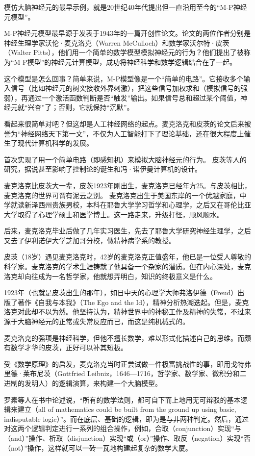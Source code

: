 模仿大脑神经元的最早示例，就是20世纪40年代提出但一直沿用至今的“M-P神经元模型”。

M-P神经元模型最早源于发表于1943年的一篇开创性论文。论文的两位作者分别是神经生理学家沃伦·麦克洛克（Warren McCulloch）和数学家沃尔特·皮茨（Walter Pitts），他们用一个简单的数学模型模拟神经元的行为？他们提出了被称为“M-P模型”的神经元计算模型，成功将神经科学和数学逻辑结合在了一起。

这个模型是怎么回事？简单来说，M-P模型像是一个“简单的电路”。它接收多个输入信号（比如神经元的树突接收外界刺激），把这些信号加权求和（模拟信号的强弱），再通过一个激活函数判断是否“触发”输出。如果信号总和超过某个阈值，神经元就“兴奋”了；否则，它就保持“沉默”。

看起来很简单对吧？但这却是人工神经网络的起点。麦克洛克和皮茨的论文后来被誉为“神经网络天下第一文”，不仅为人工智能打下了理论基础，还在很大程度上催生了现代计算机科学的发展。


首次实现了用一个简单电路（即感知机）来模拟大脑神经元的行为。
皮茨等人的研究，据说甚至影响了控制论的诞生和冯·诺伊曼计算机的设计。

麦克洛克比皮茨大一辈，皮茨1923年刚出生，麦克洛克已经年方25。与皮茨相比，麦克洛克的世界可谓有泥云之别。
麦克洛克出生于美国东岸的一个优越家庭，中学就读新泽西州贵族男校，本科在耶鲁大学学习哲学和心理学，之后又在哥伦比亚大学取得了心理学硕士和医学博士。这一路走来，升级打怪，顺风顺水。

后来，麦克洛克毕业后做了几年实习医生，先去了耶鲁大学研究神经生理学，之后又去了伊利诺伊大学芝加哥分校，做精神病学系的教授。

皮茨（18岁）遇见麦克洛克时，42岁的麦克洛克正值盛年，他已是一位受人尊敬的科学家。麦克洛克的学术生涯铸就了他具备一个杂家的潜质。但在内心深处，麦克洛克却向往成为一名哲学家，他就想弄明白，知识的终极意义是什么。

1923年（也就是皮茨出生的那年），如日中天的心理学大师弗洛伊德（Freud）出版了著作《自我与本我》（The Ego and the Id），精神分析热潮迭起。但是，麦克洛克对此却不以为然。他坚持认为，精神世界中的神秘工作及精神的失常，不过来源于大脑神经元的正常或失常反应而已，而这是纯机械式的。

麦克洛克的强项是神经科学，但他不擅长数学，难以形式化描述自己的思维。而颇有数学才华的皮茨，正好可以补其短板。

受《数学原理》的启发，麦克洛克当时正尝试做一件极富挑战性的事，即用戈特弗里德·莱布尼茨（Gottfried Leibniz，1646—1716，哲学家、数学家、微积分和二进制的发明人）的逻辑演算，来构建一个大脑模型。

罗素等人在书中论述说，“所有的数学法则，都可自下而上地用无可辩驳的基本逻辑来建立（all of mathematics could be built from the ground up using basic, indisputable logic）”。而在底层、基础的逻辑，即为是与非两种判定。然后，通过对这两个逻辑判定进行一系列的组合操作，例如，合取（conjunction）实现“与（and）”操作、析取（disjunction）实现“或（or）”操作、取反（negation）实现“否（not）”操作，这样就可以一砖一瓦地构建起复杂的数学大厦。

